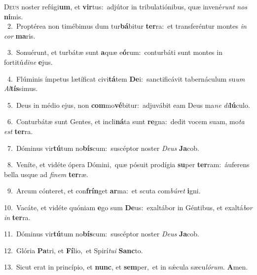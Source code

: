 \lettrine{\initial\textcolor{\initialcolor}{D}}{eus} noster refúgi\-\textbf{um}\-, et \textbf{vir}\-tus:~\star adjútor in tribulatiónibus, quæ invené\textit{runt} \textit{nos} \textbf{ni}\-mis.\\
{\numbfont\textcolor{\numbcolor}{~2.}}~Proptérea non timébimus dum tur\-\textbf{bá}\-bitur \textbf{ter}\-ra:~\star et transferéntur montes \textit{in} \textit{cor} \textbf{ma}\-ris.\par
{\numbfont\textcolor{\numbcolor}{~3.}}~Sonuérunt, et turbátæ sunt \textbf{a}\-quæ e\-\textbf{ó}\-rum:~\star conturbáti sunt montes in fortitú\-\textit{di}\-\textit{ne} \textbf{e}\-jus.\par
{\numbfont\textcolor{\numbcolor}{~4.}}~Flúminis ímpetus lætíficat civi\-\textbf{tá}\-tem \textbf{De}\-i:~\star sanctificávit tabernáculum su\textit{um} \textit{Al}\-\textbf{tís}simus.\par
{\numbfont\textcolor{\numbcolor}{~5.}}~Deus in médio ejus, non \textbf{com}\-mo\-\textbf{vé}\-bitur:~\star adjuvábit eam Deus ma\textit{ne} \textit{di}\-\textbf{lú}culo.\par
{\numbfont\textcolor{\numbcolor}{~6.}}~Conturbátæ sunt Gentes, et incli\-\textbf{ná}\-ta sunt \textbf{re}\-gna:~\star dedit vocem suam, mo\textit{ta} \textit{est} \textbf{ter}\-ra.\par
{\numbfont\textcolor{\numbcolor}{~7.}}~Dóminus vir\-\textbf{tú}\-tum no\-\textbf{bís}\-cum:~\star suscéptor noster \textit{De}\-\textit{us} \textbf{Ja}\-cob.\par
{\numbfont\textcolor{\numbcolor}{~8.}}~Veníte, et vidéte ópera Dómini,~\dagger quæ pósuit prodígia \textbf{su}\-per \textbf{ter}\-ram:~\star áuferens bella usque ad \textit{fi}\-\textit{nem} \textbf{ter}\-ræ.\par
{\numbfont\textcolor{\numbcolor}{~9.}}~Arcum cónteret, et con\-\textbf{frín}\-get \textbf{ar}\-ma:~\star et scuta com\-\textit{bú}\-\textit{ret} \textbf{i}\-gni.\par
{\numbfont\textcolor{\numbcolor}{10.}}~Vacáte, et vidéte quóniam \textbf{e}\-go sum \textbf{De}\-us:~\star exaltábor in Géntibus, et exaltá\textit{bor} \textit{in} \textbf{ter}\-ra.\par
{\numbfont\textcolor{\numbcolor}{11.}}~Dóminus vir\-\textbf{tú}\-tum no\-\textbf{bís}\-cum:~\star suscéptor noster \textit{De}\-\textit{us} \textbf{Ja}\-cob.\par
{\numbfont\textcolor{\numbcolor}{12.}}~Glória \textbf{Pa}\-tri, et \textbf{Fí}\-lio,~\star et Spirí\-\textit{tu}\-\textit{i} \textbf{Sanc}\-to.\par
{\numbfont\textcolor{\numbcolor}{13.}}~Sicut erat in princípio, et \textbf{nunc}\-, et \textbf{sem}\-per,~\star et in sǽcula sæcu\-\textit{ló}\-\textit{rum}. \textbf{A}\-men.\par
